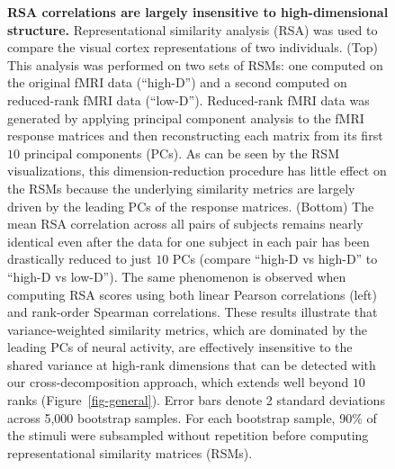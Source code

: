 \documentclass[10pt]{article}
\begin{document}
\begin{figure}[H]
\caption{\label{fig-rsa}\textbf{RSA correlations are largely insensitive
to high-dimensional structure.} Representational similarity analysis
(RSA) was used to compare the visual cortex representations of two
individuals. (Top) This analysis was performed on two sets of RSMs: one
computed on the original fMRI data (``high-D'') and a second computed on
reduced-rank fMRI data (``low-D''). Reduced-rank fMRI data was generated
by applying principal component analysis to the fMRI response matrices
and then reconstructing each matrix from its first \(10\) principal
components (PCs). As can be seen by the RSM visualizations, this
dimension-reduction procedure has little effect on the RSMs because the
underlying similarity metrics are largely driven by the leading PCs of
the response matrices. (Bottom) The mean RSA correlation across all
pairs of subjects remains nearly identical even after the data for one
subject in each pair has been drastically reduced to just \(10\) PCs
(compare ``high-D vs high-D'' to ``high-D vs low-D''). The same
phenomenon is observed when computing RSA scores using both linear
Pearson correlations (left) and rank-order Spearman correlations. These
results illustrate that variance-weighted similarity metrics, which are
dominated by the leading PCs of neural activity, are effectively
insensitive to the shared variance at high-rank dimensions that can be
detected with our cross-decomposition approach, which extends well
beyond \(10\) ranks (Figure~\ref{fig-general}). Error bars denote 2
standard deviations across 5,000 bootstrap samples. For each bootstrap
sample, 90\% of the stimuli were subsampled without repetition before
computing representational similarity matrices (RSMs).}

\end{figure}%

\newpage
\printbibliography
\end{document}
